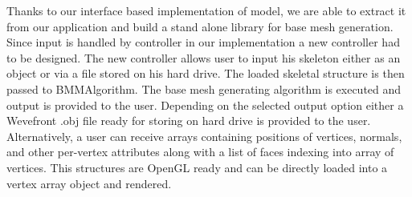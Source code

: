 Thanks to our interface based implementation of model, we are able to extract it from our application and build a stand alone library for base mesh generation.
Since input is handled by controller in our implementation a new controller had to be designed.
The new controller allows user to input his skeleton either as an object or via a file stored on his hard drive.
The loaded skeletal structure is then passed to BMMAlgorithm.
The base mesh generating algorithm is executed and output is provided to the user.
Depending on the selected output option either a Wevefront .obj file ready for storing on hard drive is provided to the user.
Alternatively, a user can receive arrays containing positions of vertices, normals, and other per-vertex attributes along with a list of faces indexing into array of vertices.
This structures are OpenGL ready and can be directly loaded into a vertex array object and rendered.
